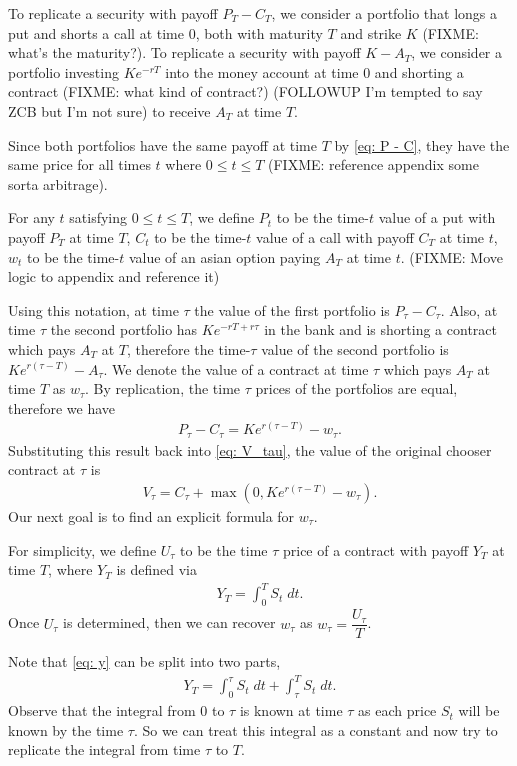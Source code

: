 \documentclass[reqno]{amsart}
\begin{document}
To replicate a security with payoff $P_T - C_T$, we consider a portfolio that longs a put and shorts a call at time $0$, both with maturity $T$ and strike $K$ (FIXME: what's the maturity?). To replicate a security with payoff $K - A_T$,  we consider a portfolio investing $Ke^{-rT}$ into the money account at time 0 and shorting a contract (FIXME: what kind of contract?) (FOLLOWUP I'm tempted to say ZCB but I'm not sure) to receive $A_T$ at time $T$. 

Since both portfolios have the same payoff at time $T$ by \eqref{eq: P - C}, they have the same price for all times $t$ where $0 \leq t \leq T$ (FIXME: reference appendix some sorta arbitrage). 

For any $t$ satisfying $0 \le t \le T$, we define $P_t$ to be the time-$t$ value of a put with payoff $P_T$ at time $T$, $C_t$ to be the time-$t$ value of a call with payoff $C_T$ at time $t$, $w_t$ to be the time-$t$ value of an asian option paying $A_T$ at time $t$. (FIXME: Move logic to appendix and reference it)

Using this notation, at time $\tau$ the value of the first portfolio is $P_\tau - C_\tau$. Also, at time $\tau$ the second portfolio has $Ke^{-rT + r\tau}$ in the bank and is shorting a contract which pays $A_T$ at $T$, therefore the time-$\tau$ value of the second portfolio is $Ke^{r(\tau - T)} - A_\tau$. We denote the value of a contract at time $\tau$ which pays $A_T$ at time $T$ as $w_\tau$.
By replication, the time $\tau$ prices of the portfolios are equal, therefore we have 
\begin{align}\label{eq: P-C Parity}
     P_\tau - C_\tau = Ke^{r(\tau - T)} - w_\tau.
\end{align}
Substituting this result back into \eqref{eq: V_tau}, the value of the original chooser contract at $\tau$ is
\begin{align}
     V_\tau = C_\tau + \max(0, Ke^{r(\tau - T)} - w_\tau).
\end{align}
Our next goal is to find an explicit formula for $w_\tau$. 

For simplicity, we define $U_\tau$ to be the time $\tau$ price of a contract with payoff $Y_T$ at time $T$, where $Y_T$ is defined via
\begin{align}\label{eq: y}
     Y_T = \int_0^T S_t \; dt.
\end{align}
Once $U_\tau$ is determined, then we can recover $w_\tau$ as $w_\tau = \dfrac{U_\tau}{T}$. 

Note that \eqref{eq: y} can be split into
two parts, 
\begin{align}
     Y_T = \int_0^\tau S_t \; dt + \int_\tau^T S_t \; dt.
\end{align}
Observe that the integral from $0$ to $\tau$ is known at time $\tau$ as each price $S_t$ will be known by the time $\tau$. So we can treat this integral as a constant and now try to replicate the integral from time $\tau$ to $T$.
\end{document}
